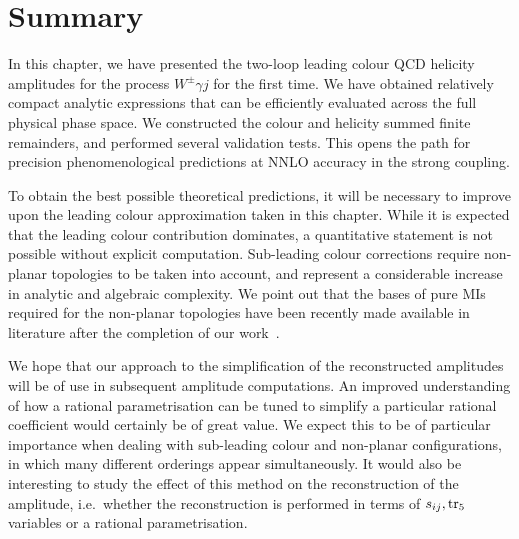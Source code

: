 \documentclass[main.tex]{subfiles}
\begin{document}
\section{Summary}
\label{wyjsec:conclusions}
In this chapter, we have presented the two-loop leading colour QCD helicity amplitudes for the
process $W^{\pm}\gamma j$ for the first time. We have obtained relatively compact analytic
expressions that can be efficiently evaluated across the full physical phase space. We constructed
the colour and helicity summed finite remainders, and performed several validation tests. This opens
the path for precision phenomenological predictions at NNLO accuracy in the strong coupling.

To obtain the best possible theoretical predictions, it will be necessary to improve upon the leading
colour approximation taken in this chapter. While it is expected that the leading colour contribution
dominates, a quantitative statement is not possible without explicit computation. Sub-leading colour
corrections require non-planar topologies to be taken into account, and represent a considerable
increase in analytic and algebraic complexity. We point out that the bases of pure MIs required for the non-planar topologies have been recently made available in literature after the completion of our work~\cite{Abreu:2023rco}.

We hope that our approach to the simplification of the reconstructed amplitudes will be of use in
subsequent amplitude computations. An improved understanding of how a rational parametrisation can
be tuned to simplify a particular rational coefficient would certainly be of great value. We expect
this to be of particular importance when dealing with sub-leading colour and non-planar
configurations, in which many different orderings appear simultaneously. It would also be interesting
to study the effect of this method on the reconstruction of the amplitude, i.e.\ whether the
reconstruction is performed in terms of $s_{ij}, \operatorname{\rm tr}_5$ variables or a rational parametrisation.
\end{document}

